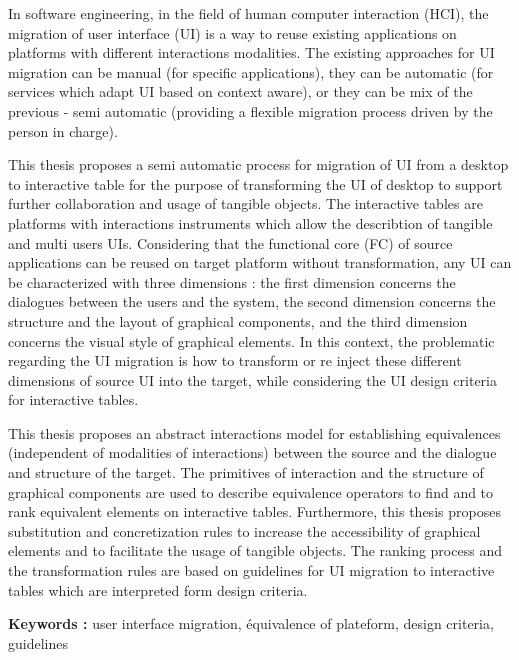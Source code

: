 In software engineering, in the field of human computer interaction (HCI), the migration of user interface
(UI) is a way to reuse existing applications on platforms with different interactions modalities. The existing
approaches for UI migration can be manual (for specific applications), they can be automatic (for services
which adapt UI based on context aware), or they can be mix of the previous - semi automatic (providing a
flexible migration process driven by the person in charge).

	This thesis proposes a semi automatic process for migration of UI from a desktop to interactive table for the
purpose of transforming the UI of desktop to support further collaboration and usage of tangible objects. The
interactive tables are platforms with interactions instruments which allow the describtion of tangible and multi
users UIs. Considering that the functional core (FC) of source applications can be reused on target platform
without transformation, any UI can be characterized with three dimensions : the first dimension concerns the
dialogues between the users and the system, the second dimension concerns the structure and the layout of
graphical components, and the third dimension concerns the visual style of graphical elements. In this context,
the problematic regarding the UI migration is how to transform or re inject these different dimensions of source
UI into the target, while considering the UI design criteria for interactive tables.

	This thesis proposes an abstract interactions model for establishing equivalences (independent of modalities
of interactions) between the source and the dialogue and structure of the target. The primitives of interaction and
the structure of graphical components are used to describe equivalence operators to find and to rank equivalent
elements on interactive tables. Furthermore, this thesis proposes substitution and concretization rules to increase
the accessibility of graphical elements and to facilitate the usage of tangible objects. The ranking process and
the transformation rules are based on guidelines for UI migration to interactive tables which are interpreted
form design criteria.

\textbf{Keywords :} user interface migration, équivalence of plateform, design criteria, guidelines